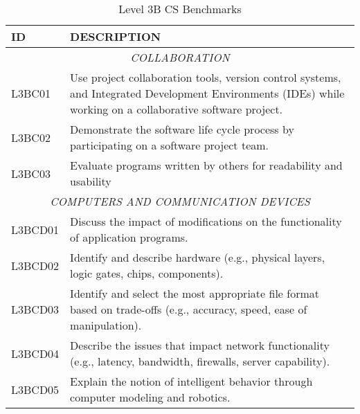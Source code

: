\begin{longtable}{p{1.8cm}p{11cm}}
\caption{Level 3B CS Benchmarks} \\
\textbf{ID} & \textbf{DESCRIPTION} \\ \hline
\multicolumn{2}{c}{\textit{COLLABORATION}} \\
 L3BC01  & Use project collaboration tools, version control systems, and Integrated Development Environments (IDEs) while working on a collaborative software project.                                                                \\
 L3BC02  & Demonstrate the software life cycle process by participating on a software project team.                                                                                                                                   \\
 L3BC03  & Evaluate programs written by others for readability and usability                                                                                                                                                          \\
 \multicolumn{2}{c}{\textit{COMPUTERS AND COMMUNICATION DEVICES}}                                                                                                                                                                                 \\
 L3BCD01 & Discuss the impact of modifications on the functionality of application programs.                                                                                                                                          \\
 L3BCD02 & Identify and describe hardware (e.g., physical layers, logic gates, chips, components).                                                                                                                                    \\
 L3BCD03 & Identify and select the most appropriate file format based on trade-offs (e.g., accuracy, speed, ease of manipulation).                                                                                                    \\
 L3BCD04 & Describe the issues that impact network functionality (e.g., latency, bandwidth, firewalls, server capability).                                                                                                            \\
 L3BCD05 & Explain the notion of intelligent behavior through computer modeling and robotics.                                                                                                                                         \\

\end{longtable}
